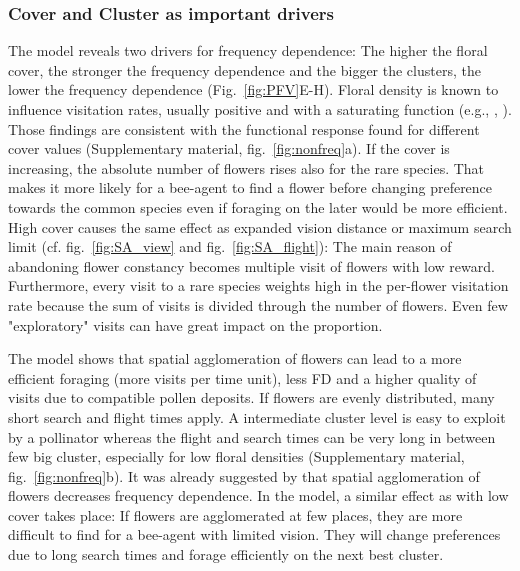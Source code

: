 \subsubsection*{Cover and Cluster as important drivers}
The model reveals two drivers for frequency dependence: The higher the floral cover, the stronger the frequency dependence and the bigger the clusters, the lower the frequency dependence (Fig.~\ref{fig:PFV}E-H). 
Floral density is known to influence visitation rates, usually positive and with a saturating function (e.g.\citealt{essenberg2012explaining}, \citealt{bernhardt2008effects}, \citealt{Kunin1997}). Those findings are consistent with the functional response found for different cover values (Supplementary material, fig.~\ref{fig:nonfreq}a). If the cover is increasing, the absolute number of flowers rises also for the rare species. That makes it more likely for a bee-agent to find a flower before changing preference towards the common species even if foraging on the later would be more efficient. High cover causes the same effect as expanded vision distance or maximum search limit (cf. fig.~\ref{fig:SA_view} and fig.~\ref{fig:SA_flight}): The main reason of abandoning flower constancy becomes multiple visit of flowers with low reward. Furthermore, every visit to a rare species weights high in the per-flower visitation rate because the sum of visits is divided through the number of flowers. Even few "exploratory" visits can have great impact on the proportion. 

The model shows that spatial agglomeration of flowers can lead to a more efficient foraging (more visits per time unit), less FD and a higher quality of visits due to compatible pollen deposits. If flowers are evenly distributed, many short search and flight times apply. A intermediate cluster level is easy to exploit by a pollinator whereas the flight and search times can be very long in between few big cluster, especially for low floral densities (Supplementary material, fig.~\ref{fig:nonfreq}b). 
It was already suggested by \cite{epperson1987frequency} that spatial agglomeration of flowers decreases frequency dependence. In the model, a similar effect as with low cover takes place: If flowers are agglomerated at few places, they are more difficult to find for a bee-agent with limited vision. They will change preferences due to long search times and forage efficiently on the next best cluster. 

